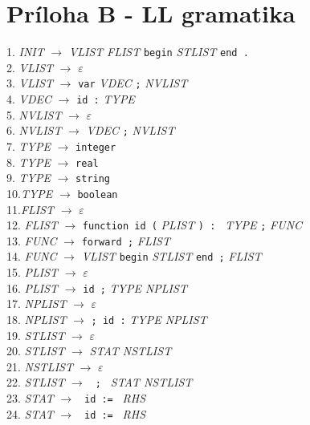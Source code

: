 \documentclass[a4paper, 11pt]{article}
\begin{document}
\section{Príloha B - LL gramatika}
1. \textit{INIT} $\rightarrow$ \textit{VLIST} \textit{FLIST} \texttt{begin} \textit{STLIST} \texttt{end .}\\
2. \textit{VLIST} $\rightarrow$ $\varepsilon$\\
3. \textit{VLIST} $\rightarrow$ \texttt{var} \textit{VDEC} \texttt{;} \textit{NVLIST}\\
4. \textit{VDEC} $\rightarrow$ \texttt{id :} \textit{TYPE}\\
5. \textit{NVLIST} $\rightarrow$ $\varepsilon$\\
6. \textit{NVLIST} $\rightarrow$ \textit{VDEC} \texttt{;} \textit{NVLIST}\\
7. \textit{TYPE} $\rightarrow$ \texttt{integer}\\
8. \textit{TYPE} $\rightarrow$ \texttt{real}\\
9. \textit{TYPE} $\rightarrow$ \texttt{string}\\
10.\textit{TYPE} $\rightarrow$ \texttt{boolean}\\
11.\textit{FLIST} $\rightarrow$ $\varepsilon$\\
12. \textit{FLIST} $\rightarrow$ \texttt{function id (} \textit{PLIST} \texttt{) : } \textit{TYPE} \texttt{;} \textit{FUNC}\\
13. \textit{FUNC} $\rightarrow$ \texttt{forward ;} \textit{FLIST}\\
14. \textit{FUNC} $\rightarrow$ \textit{VLIST} \texttt{begin} \textit{STLIST} \texttt{end ;} \textit{FLIST}\\
15. \textit{PLIST} $\rightarrow$ $\varepsilon$\\
16. \textit{PLIST} $\rightarrow$ \texttt{id ;} \textit{TYPE NPLIST}\\
17. \textit{NPLIST} $\rightarrow$ $\varepsilon$\\
18. \textit{NPLIST} $\rightarrow$ \texttt{; id :} \textit{TYPE NPLIST}\\
19. \textit{STLIST} $\rightarrow$ $\varepsilon$\\
20. \textit{STLIST} $\rightarrow$ \textit{STAT NSTLIST}\\
21. \textit{NSTLIST} $\rightarrow$ $\varepsilon$\\
22. \textit{STLIST} $\rightarrow$ \texttt{ ; } \textit{STAT NSTLIST}\\
23. \textit{STAT} $\rightarrow$ \texttt{ id := } \textit{RHS}\\
24. \textit{STAT} $\rightarrow$ \texttt{ id := } \textit{RHS}\\
\end{document}
